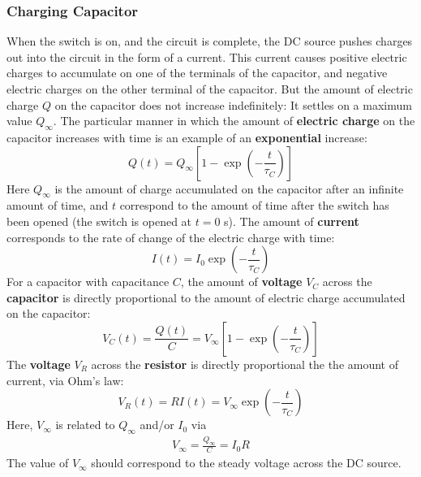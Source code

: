 \subsubsection{Charging Capacitor}
When the switch is on, and the circuit is complete, the DC source pushes charges out into the circuit in the form of a current. This current causes positive electric charges to accumulate on one of the terminals of the capacitor, and negative electric charges on the other terminal of the capacitor. But the amount of electric charge $Q$ on the capacitor does not increase indefinitely: It settles on a maximum value $Q_{\infty}$. The particular manner in which the amount of \textbf{electric charge} on the capacitor increases with time is an example of an \textbf{exponential} increase:
\begin{equation}
    Q(t) = Q_{\infty} \left[ 1 - \exp\left(-\frac{t}{\tau_{C}}\right) \right]
    \label{eq.05.RC.q.charging}
\end{equation}
Here $Q_{\infty}$ is the amount of charge accumulated on the capacitor after an infinite amount of time, and $t$ correspond to the amount of time after the switch has been opened (the switch is opened at $t = 0$ s). The amount of \textbf{current} corresponds to the rate of change of the electric charge with time:
\begin{equation}
    I(t) = I_{0} \exp\left(-\frac{t}{\tau_{C}}\right)
    \label{eq.05.RC.i.charging}
\end{equation}
For a capacitor with capacitance $C$, the amount of \textbf{voltage} $V_{C}$ across the \textbf{capacitor} is directly proportional to the amount of electric charge accumulated on the capacitor:
\begin{equation}
    V_{C}(t) = \frac{Q(t)}{C} = V_{\infty} \left[ 1 - \exp\left(-\frac{t}{\tau_{C}}\right) \right]
    \label{eq.05.RC.vC.charging}
\end{equation}
The \textbf{voltage} $V_{R}$ across the \textbf{resistor} is directly proportional the the amount of current, via Ohm's law:
\begin{equation}
    V_{R}(t) = R I(t) = V_{\infty} \exp\left(-\frac{t}{\tau_{C}}\right)
    \label{eq.05.RC.vR.charging}
\end{equation}
Here, $V_{\infty}$ is related to $Q_{\infty}$ and/or $I_{0}$ via
\begin{eqnarray}
    V_{\infty} = \frac{Q_{\infty}}{C} = I_{0} R
\end{eqnarray}
The value of $V_{\infty}$ should correspond to the steady voltage across the DC source.

